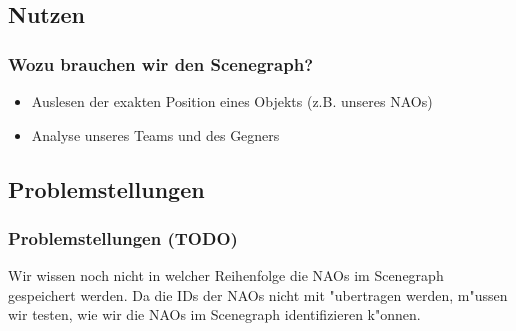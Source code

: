 \subsection{Nutzen}
\frame %
{
  \frametitle{Wozu brauchen wir den Scenegraph?} %
  	 \begin{itemize}
	  \item Auslesen der exakten Position eines Objekts (z.B. unseres NAOs)
	  \item Analyse unseres Teams und des Gegners
	\end{itemize}
}

\subsection{Problemstellungen}
\frame
{
  \frametitle{Problemstellungen (TODO)} %
	 Wir wissen noch nicht in welcher Reihenfolge die NAOs im Scenegraph gespeichert werden. Da die IDs der NAOs nicht mit "ubertragen werden, m"ussen wir testen, wie wir die NAOs im Scenegraph identifizieren k"onnen.
}